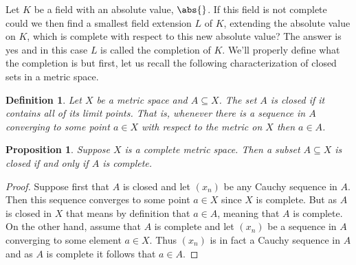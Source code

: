 \documentclass{article}
\newtheorem{definition}{Definition}[section]
\newtheorem{proposition}{Proposition}[section]
\numberwithin{equation}{section}
\begin{document}
Let $K$ be a field with an absolute value, $\abs{}$. If this field is not complete could we then find a smallest field extension $L$ of $K$, extending the absolute value on $K$, which is complete with respect to this new absolute value? The answer is yes and in this case $L$ is called the completion of $K$. We'll properly define what the completion is but first, let us recall the following characterization of closed sets in a metric space.

\begin{definition}
	Let $X$ be a metric space and $A \subseteq X$. The set $A$ is closed if it contains all of its limit points. That is, whenever there is a sequence in $A$ converging to some point $a \in X$ with respect to the metric on $X$ then $a \in A$.
\end{definition}

\begin{proposition}
	Suppose $X$ is a complete metric space. Then a subset $A \subseteq X$ is closed if and only if $A$ is complete.
\end{proposition}
\begin{proof}
	Suppose first that $A$ is closed and let $(x_n)$ be any Cauchy sequence in $A$. Then this sequence converges to some point $a \in X$ since $X$ is complete. But as $A$ is closed in $X$ that means by definition that $a \in A$, meaning that $A$ is complete. On the other hand, assume that $A$ is complete and let $(x_n)$ be a sequence in $A$ converging to some element $a \in X$. Thus $(x_n)$ is in fact a Cauchy sequence in $A$ and as $A$ is complete it follows that $a \in A$.
\end{proof}
\end{document}
